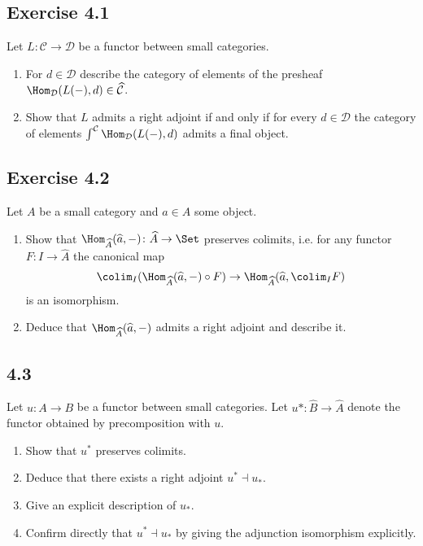 \subsection{Exercise 4.1}
Let $ L \colon \mathcal{ C } \to \mathcal{ D } $ be a functor between small categories.

\begin{enumerate}[label=(\alph*)]
    \item 
    For $ d \in \mathcal{ D } $ describe the category of elements of the presheaf $\Hom_{\mathcal{ D } } ( L ( - ) , d ) \in \widehat{ \mathcal{ C } }$.

    \item 
    Show that $ L $ admits a right adjoint if and only if for every $d \in \mathcal{ D } $ the category of elements $ \int^{ \mathcal{ C } } \Hom_{ \mathcal{ D } } ( L ( - ) , d ) $ admits a final object.
\end{enumerate}

\subsection{Exercise 4.2}
Let $ A $ be a small category and $ a \in A $ some object.

\begin{enumerate}[label=(\alph*)]
    \item 
    Show that $ \Hom_{\widehat{A}}( \widehat{a} , - ) \colon \widehat{A} \to \Set $ preserves colimits, i.e. for any functor $ F \colon I \to \widehat{ A } $ the canonical map 
    \[
        \colim_I ( \Hom_{ \widehat{ A } } ( \widehat{ a } , - ) \circ F ) \to \Hom_{ \widehat{ A } }( \widehat{ a }, \colim_I F )
    \]
    is an isomorphism.

    \item 
    Deduce that $\Hom_{\widehat{A}} ( \widehat{a} , - ) $ admits a right adjoint and describe it.
\end{enumerate}

\subsection{4.3}
Let $ u \colon A \to  B $ be a functor between small categories. 
Let $ u* \colon \widehat{ B } \to \widehat{ A } $ denote the functor obtained by precomposition with $ u $.

\begin{enumerate}[label=(\alph*)]
    \item 
    Show that $u^*$ preserves colimits.

    \item 
    Deduce that there exists a right adjoint $ u^* \dashv u_* $.

    \item 
    Give an explicit description of $ u _*$.

    \item 
    Confirm directly that $ u^* \dashv u_* $ by giving the adjunction isomorphism explicitly.
\end{enumerate}


